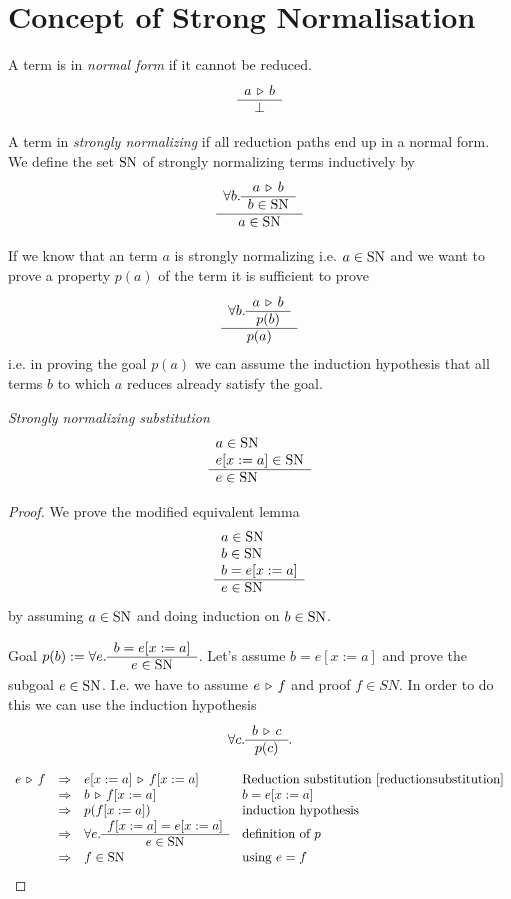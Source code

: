 \section{Concept of Strong Normalisation}


\begin{definition}
  A term is in \emph{normal form} if it cannot be reduced.
  $$
  \begin{array}{c} a \,\triangleright\, b \\ \hline \perp\end{array}
  $$
\end{definition}



\begin{definition}
  A term in \emph{strongly normalizing} if all reduction paths end up in a
  normal form. We define the set $\text{SN}$ of strongly normalizing terms
  inductively by
  $$
  \begin{array}{c} 
    \forall b.
    \begin{array}{c} a \,\triangleright\, b \\ \hline b \in \text{SN}\end{array}
   \\ \hline a \in \text{SN}\end{array}
  $$
\end{definition}


If we know that an term $a$ is strongly normalizing i.e. $a \in \text{SN}$ and we
want to prove a property $p(a)$ of the term it is sufficient to prove
$$
\begin{array}{c} \forall b.
  \begin{array}{c} a \,\triangleright\, b \\ \hline  p(b)\end{array}
 \\ \hline p(a)\end{array}
$$
i.e. in proving the goal $p(a)$ we can assume the induction hypothesis that
all terms $b$ to which $a$ reduces already satisfy the goal.



\begin{lemma}
  \emph{Strongly normalizing substitution}
  \label{stronglynormalizingsubstitution}
  $$
  \begin{array}{l} 
    a \in \text{SN}
    \\
    e[x:=a] \in \text{SN} \\ \hline e \in \text{SN}\end{array}
  $$

  \begin{proof}
    We prove the modified equivalent lemma
    $$
    \begin{array}{l} 
      a \in \text{SN}
      \\
      b \in \text{SN}
      \\
      b = e[x:=a]
     \\ \hline e \in \text{SN}\end{array}
    $$
    by assuming $a \in \text{SN}$ and doing induction on $b \in \text{SN}$.

    Goal $p(b) := \forall e. \begin{array}{c} b = e[x:=a] \\ \hline e \in \text{SN}\end{array}$. Let's assume
    $b = e[x:=a]$ and prove the subgoal $e \in \text{SN}$. I.e. we have to assume
    $e \,\triangleright\, f$ and proof $f \in SN$. In order to do this we can use the
    induction hypothesis
    $$
    \forall c. \begin{array}{c} b \,\triangleright\, c \\ \hline p(c)\end{array}.
    $$

    $$
    \begin{array}{llll}
      e \,\triangleright\, f
      & \Rightarrow & e[x:=a] \,\triangleright\, f[x:=a]
      & \text{Reduction substitution~\ref{reductionsubstitution}}
      \\
      & \Rightarrow & b \,\triangleright\, f[x:=a]
      & b = e[x:=a]
      \\
      & \Rightarrow & p(f[x:=a])  & \text{induction hypothesis}
      \\
      & \Rightarrow & \forall e. \begin{array}{c} f[x:=a] = e[x:=a] \\ \hline e \in \text{SN}\end{array}
      & \text{definition of $p$}
      \\
      & \Rightarrow & f \in \text{SN} & \text{using } e = f
    \end{array}
    $$
  \end{proof}
\end{lemma}



